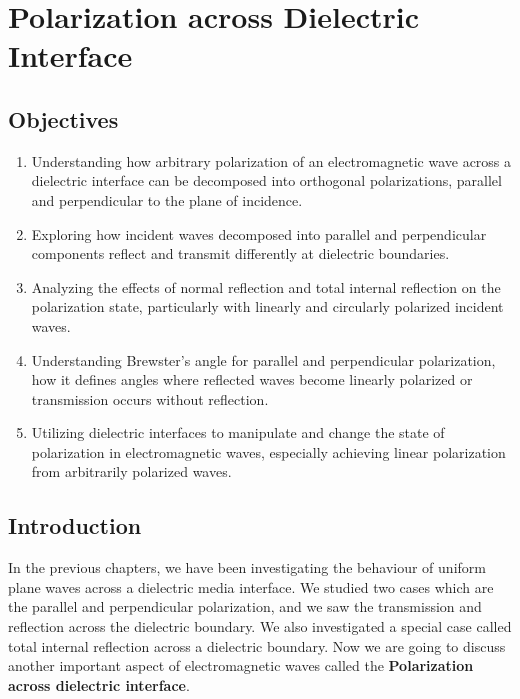 \chapter{Polarization across Dielectric Interface}\label{lec:lec33}

\begin{mdframed}[backgroundcolor=lightblue, linewidth=1pt, hidealllines=true]
    \section{Objectives}
    \begin{enumerate}[label=\roman*., itemsep=0pt, topsep=0pt]
        \item Understanding how arbitrary polarization of an electromagnetic wave across a dielectric interface can be decomposed into orthogonal polarizations, parallel and perpendicular to the plane of incidence.
        \item Exploring how incident waves decomposed into parallel and perpendicular components reflect and transmit differently at dielectric boundaries.
        \item Analyzing the effects of normal reflection and total internal reflection on the polarization state, particularly with linearly and circularly polarized incident waves.
        \item Understanding Brewster's angle for parallel and perpendicular polarization, how it defines angles where reflected waves become linearly polarized or transmission occurs without reflection.
        \item Utilizing dielectric interfaces to manipulate and change the state of polarization in electromagnetic waves, especially achieving linear polarization from arbitrarily polarized waves.
    \end{enumerate}
\end{mdframed}

\section{Introduction}

In the previous chapters, we have been investigating the behaviour of uniform plane waves across a dielectric media interface. We studied two cases which are the parallel and perpendicular polarization, and we saw the transmission and reflection across the dielectric boundary. We also investigated a special case called total internal reflection across a dielectric boundary. Now we are going to discuss another important aspect of electromagnetic waves called the \textbf{Polarization across dielectric interface}. 

